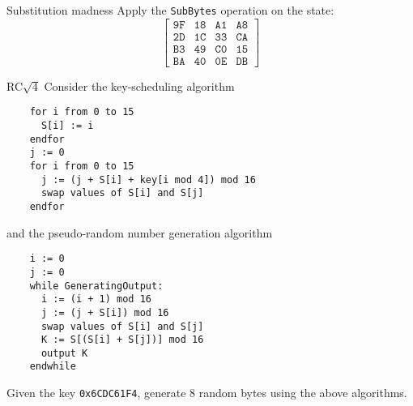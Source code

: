 \documentclass{practice}
\begin{document}
\begin{task}{Substitution madness}
  Apply the \texttt{SubBytes} operation on the state:
  \[
    \begin{bmatrix}
      \mathtt{9F} & \mathtt{18} & \mathtt{A1} & \mathtt{A8}\\
      \mathtt{2D} & \mathtt{1C} & \mathtt{33} & \mathtt{CA}\\
      \mathtt{B3} & \mathtt{49} & \mathtt{C0} & \mathtt{15}\\
      \mathtt{BA} & \mathtt{40} & \mathtt{0E} & \mathtt{DB}
    \end{bmatrix}
  \]
\end{task}

\begin{task}{RC$\sqrt{4}$}
  Consider the key-scheduling algorithm
  \begin{lstlisting}
    for i from 0 to 15
      S[i] := i
    endfor
    j := 0
    for i from 0 to 15
      j := (j + S[i] + key[i mod 4]) mod 16
      swap values of S[i] and S[j]
    endfor
  \end{lstlisting}

  and the pseudo-random number generation algorithm
  \begin{lstlisting}
    i := 0
    j := 0
    while GeneratingOutput:
      i := (i + 1) mod 16
      j := (j + S[i]) mod 16
      swap values of S[i] and S[j]
      K := S[(S[i] + S[j])] mod 16
      output K
    endwhile
  \end{lstlisting}

  Given the key \texttt{0x6CDC61F4}, generate 8 random bytes using the above algorithms.
\end{task}
\end{document}
